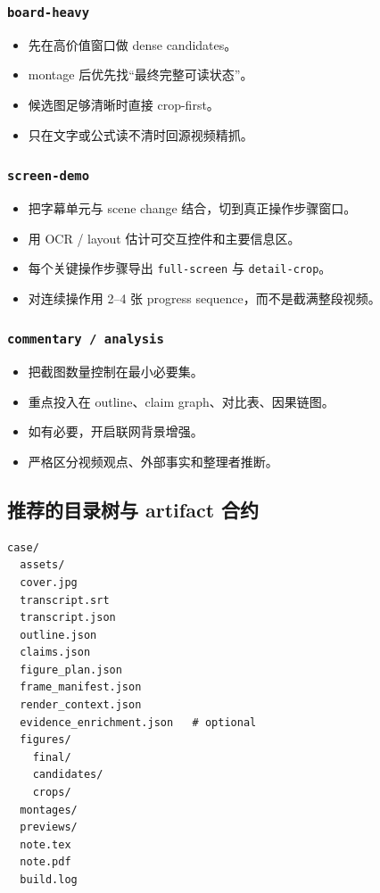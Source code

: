 \documentclass[a4paper]{article}
\begin{document}
\subsubsection{\texttt{board-heavy}}

\begin{itemize}
\item 先在高价值窗口做 dense candidates。
\item montage 后优先找“最终完整可读状态”。
\item 候选图足够清晰时直接 crop-first。
\item 只在文字或公式读不清时回源视频精抓。
\end{itemize}

\subsubsection{\texttt{screen-demo}}

\begin{itemize}
\item 把字幕单元与 scene change 结合，切到真正操作步骤窗口。
\item 用 OCR / layout 估计可交互控件和主要信息区。
\item 每个关键操作步骤导出 \texttt{full-screen} 与 \texttt{detail-crop}。
\item 对连续操作用 2--4 张 progress sequence，而不是截满整段视频。
\end{itemize}

\subsubsection{\texttt{commentary / analysis}}

\begin{itemize}
\item 把截图数量控制在最小必要集。
\item 重点投入在 outline、claim graph、对比表、因果链图。
\item 如有必要，开启联网背景增强。
\item 严格区分视频观点、外部事实和整理者推断。
\end{itemize}

\subsection{推荐的目录树与 artifact 合约}

\begin{lstlisting}[caption={建议固定的 case 目录树}]
case/
  assets/
  cover.jpg
  transcript.srt
  transcript.json
  outline.json
  claims.json
  figure_plan.json
  frame_manifest.json
  render_context.json
  evidence_enrichment.json   # optional
  figures/
    final/
    candidates/
    crops/
  montages/
  previews/
  note.tex
  note.pdf
  build.log
\end{lstlisting}
\end{document}

